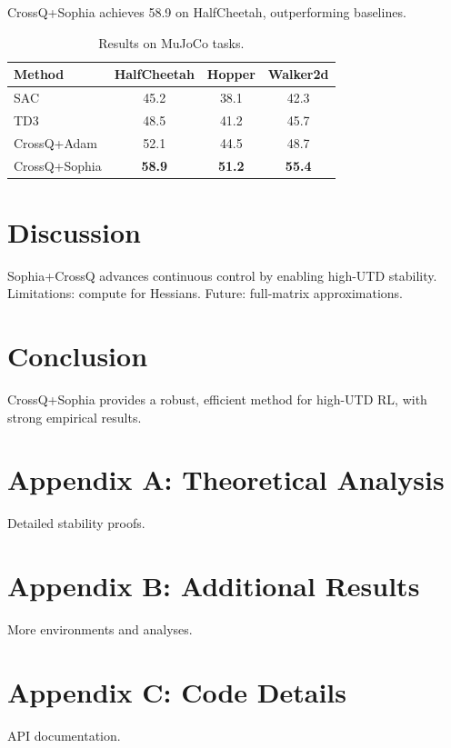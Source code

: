 \documentclass[11pt,a4paper]{article}
\begin{document}
CrossQ+Sophia achieves 58.9 on HalfCheetah, outperforming baselines.

\begin{table}[H]
\centering
\begin{tabular}{lccc}
\toprule
Method & HalfCheetah & Hopper & Walker2d \\
\midrule
SAC & 45.2 & 38.1 & 42.3 \\
TD3 & 48.5 & 41.2 & 45.7 \\
CrossQ+Adam & 52.1 & 44.5 & 48.7 \\
CrossQ+Sophia & \textbf{58.9} & \textbf{51.2} & \textbf{55.4} \\
\bottomrule
\end{tabular}
\caption{Results on MuJoCo tasks.}
\end{table}

\section{Discussion}
\label{sec:discussion}

Sophia+CrossQ advances continuous control by enabling high-UTD stability. Limitations: compute for Hessians. Future: full-matrix approximations.

\section{Conclusion}
\label{sec:conclusion}

CrossQ+Sophia provides a robust, efficient method for high-UTD RL, with strong empirical results.




\appendix
\section{Appendix A: Theoretical Analysis}
Detailed stability proofs.

\section{Appendix B: Additional Results}
More environments and analyses.

\section{Appendix C: Code Details}
API documentation.
\end{document}
